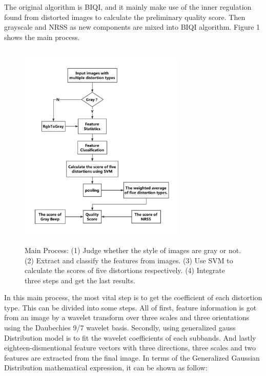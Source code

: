 The original algorithm is BIQI, and it mainly make use of  the inner regulation found from distorted images to calculate the preliminary quality score. Then grayscale and NRSS as new components are mixed into BIQI algorithm. Figure 1 shows the main process.
\begin{figure}
\centering
\includegraphics[height=10cm, width=8cm]{images/Main_process.eps}
\caption{Main Process: (1) Judge whether the style of images are gray or not. (2) Extract and classify the features from images. (3) Use SVM to calculate the scores of five distortions respectively. (4) Integrate three steps and get the last results.}
\label{1}
\end{figure}

In this main process, the most vital step is to get the coefficient of each distortion type. This can be divided into some steps. All of first, feature information is got from an image by a wavelet transform over three scales and three orientations using the Daubechies 9/7 wavelet basis. Secondly, using generalized gauss Distribution model is to fit the wavelet coefficients of each subbands. And lastly eighteen-dismentional feature vectors with three directions, three scales and two features are extracted from the final image. In terms of the Generalized Gaussian Distribution mathematical expression, it can be shown as follow:

